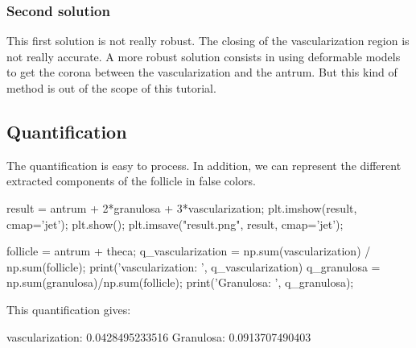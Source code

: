 \subsubsection{Second solution}
This first solution is not really robust. The closing of the vascularization region is not really accurate. A more robust solution consists in using deformable models to get the corona between the vascularization and the antrum. But this kind of method is out of the scope of this tutorial.

\subsection{Quantification}
The quantification is easy to process. In addition, we can represent the different extracted components of the follicle in false colors.

\begin{python}
result = antrum + 2*granulosa + 3*vascularization;
plt.imshow(result, cmap='jet');
plt.show();
plt.imsave("result.png", result, cmap='jet');

follicle = antrum + theca;
q_vascularization = np.sum(vascularization) / np.sum(follicle);
print('vascularization: ', q_vascularization)
q_granulosa = np.sum(granulosa)/np.sum(follicle);
print('Granulosa: ', q_granulosa);
\end{python}

\noindent This quantification gives:
\begin{sh}
vascularization:  0.0428495233516
Granulosa:  0.0913707490403
\end{sh}